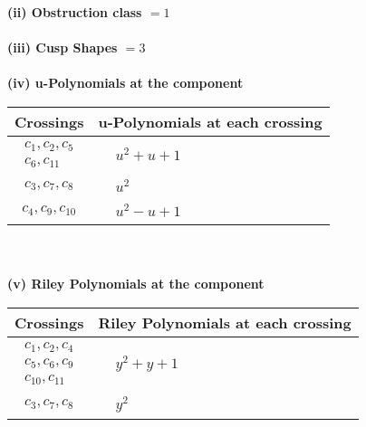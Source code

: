 \documentclass[1p]{elsarticle_modified}
\theoremstyle{definition}
\begin{document}
\flushleft \textbf{(ii) Obstruction class $= 1$}\\~\\
\flushleft \textbf{(iii) Cusp Shapes $= 3$}\\~\\
\newpage\renewcommand{\arraystretch}{1}
\flushleft \textbf{(iv) u-Polynomials at the component}\newline \\
\begin{tabular}{m{50pt}|m{274pt}}
Crossings & \hspace{64pt}u-Polynomials at each crossing \\
\hline $$\begin{aligned}c_{1},c_{2},c_{5}\\c_{6},c_{11}\end{aligned}$$&$\begin{aligned}
&u^2+u+1
\end{aligned}$\\
\hline $$\begin{aligned}c_{3},c_{7},c_{8}\end{aligned}$$&$\begin{aligned}
&u^2
\end{aligned}$\\
\hline $$\begin{aligned}c_{4},c_{9},c_{10}\end{aligned}$$&$\begin{aligned}
&u^2- u+1
\end{aligned}$\\
\hline
\end{tabular}\\~\\
\newpage\renewcommand{\arraystretch}{1}
\flushleft \textbf{(v) Riley Polynomials at the component}\newline \\
\begin{tabular}{m{50pt}|m{274pt}}
Crossings & \hspace{64pt}Riley Polynomials at each crossing \\
\hline $$\begin{aligned}c_{1},c_{2},c_{4}\\c_{5},c_{6},c_{9}\\c_{10},c_{11}\end{aligned}$$&$\begin{aligned}
&y^2+y+1
\end{aligned}$\\
\hline $$\begin{aligned}c_{3},c_{7},c_{8}\end{aligned}$$&$\begin{aligned}
&y^2
\end{aligned}$\\
\hline
\end{tabular}\\~\\
\end{document}
